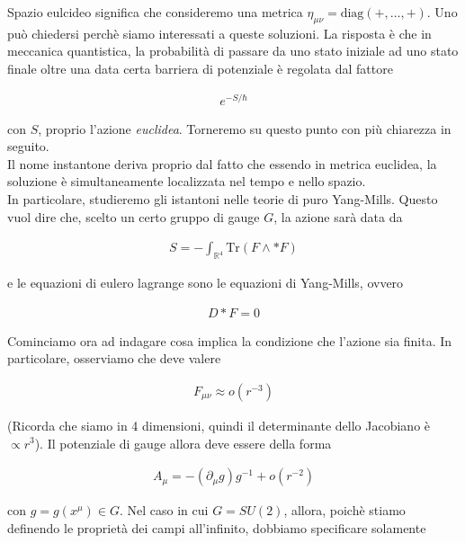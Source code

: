 \documentclass{report}
\begin{document}

Spazio eulcideo significa che consideremo una metrica \(\eta_{\mu\nu} = \text{diag}(+, \ldots, +)\). Uno può chiedersi perchè siamo interessati a queste soluzioni. La risposta è che in meccanica quantistica, la probabilità di passare da uno stato iniziale ad uno stato finale oltre una data certa barriera di potenziale è regolata dal fattore 

\begin{align}
    e^{-S/\hbar}
\end{align}

con \(S\), proprio l'azione \emph{euclidea}. Torneremo su questo punto con più chiarezza in seguito. \\

Il nome instantone deriva proprio dal fatto che essendo in metrica euclidea, la soluzione è simultaneamente localizzata nel tempo e nello spazio. \\

In particolare, studieremo gli istantoni nelle teorie di puro Yang-Mills. Questo vuol dire che, scelto un certo gruppo di gauge \(G\), la azione sarà data da 

\begin{align}
    S = -\int_{\mathbb{R}^4}\text{Tr}(F\wedge *F) 
\end{align}

e le equazioni di eulero lagrange sono le equazioni di Yang-Mills, ovvero 

\begin{align}
    D*F = 0
\end{align}

Cominciamo ora ad indagare cosa implica la condizione che l'azione sia finita. In particolare, osserviamo che deve valere 

\begin{align}
    F_{\mu\nu} \approx o(r^{-3})
\end{align}

(Ricorda che siamo in 4 dimensioni, quindi il determinante dello Jacobiano è \(\propto r^3\)). Il potenziale di gauge allora deve essere della forma 

\begin{align}
    A_\mu = -(\partial_\mu g)g^{-1} + o(r^{-2})
\end{align}

con \(g = g(x^\mu) \in G\). Nel caso in cui \(G = SU(2)\), allora, poichè stiamo definendo le proprietà dei campi all'infinito, dobbiamo specificare solamente 
\end{document}
